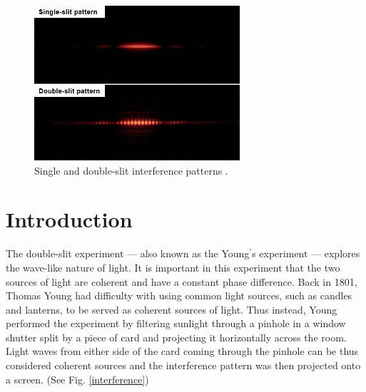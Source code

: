 \documentclass[prb,preprint]{revtex4-1}
\begin{document}
\begin{figure}[b]
\centering
\includegraphics[width=3in]{image1.jpg}
\caption{Single and double-slit interference patterns \cite{wik}.}
\label{image}
\end{figure}

\maketitle 

\section{Introduction}
The double-slit experiment --- also known as the Young$^\prime$s experiment --- explores the wave-like nature of light. It is important in this experiment that the two sources of light are coherent and have a constant phase difference. Back in 1801, Thomas Young had difficulty with using common light sources, such as candles and lanterns, to be served as coherent sources of light. Thus instead, Young performed the experiment by filtering sunlight through a pinhole in a window shutter split by a piece of card and projecting it horizontally across the room. Light waves from either side of the card coming through the pinhole can be thus considered coherent sources and the interference pattern was then projected onto a screen. (See Fig. \ref{interference})
\end{document}
